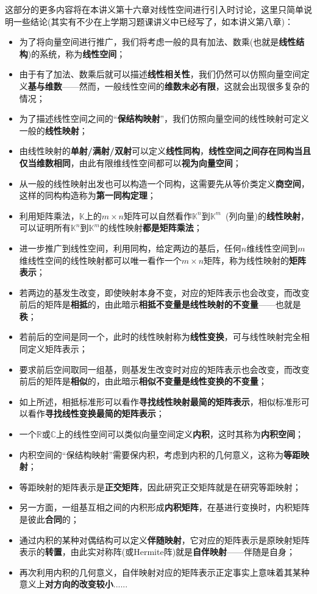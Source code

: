 \documentclass[a4paper,UTF8,fontset=windows,AutoFakeBold]{ctexart}
\begin{document}
这部分的更多内容将在本讲义第十六章对线性空间进行引入时讨论，这里只简单说明一些结论(其实有不少在上学期习题课讲义中已经写了，如本讲义第八章)：
\begin{itemize}
    \item 为了将向量空间进行推广，我们将考虑一般的具有加法、数乘(也就是\textbf{线性结构})的系统，称为\textbf{线性空间}；
    \item 由于有了加法、数乘后就可以描述\textbf{线性相关性}，我们仍然可以仿照向量空间定义\textbf{基与维数}——然而，一般线性空间的\textbf{维数未必有限}，这就会出现很多复杂的情况；
    \item 为了描述线性空间之间的``\textbf{保结构映射}''，我们仿照向量空间的线性映射可定义一般的\textbf{线性映射}；
    \item 由线性映射的\textbf{单射/满射/双射}可以定义\textbf{线性同构}，\textbf{线性空间之间存在同构当且仅当维数相同}，由此有限维线性空间都可以\textbf{视为向量空间}；
    \item 从一般的线性映射出发也可以构造一个同构，这需要先从等价类定义\textbf{商空间}，这样的同构构造称为\textbf{第一同构定理}；
    \item 利用矩阵乘法，$\mathbb{K}$上的$m\times n$矩阵可以自然看作$\mathbb{K}^n$到$\mathbb{K}^m$\ (列向量)的\textbf{线性映射}，可以证明所有$\mathbb{K}^n$到$\mathbb{K}^m$的线性映射\textbf{都是矩阵乘法}；
    \item 进一步推广到线性空间，利用同构，给定两边的基后，任何$n$维线性空间到$m$维线性空间的线性映射都可以唯一看作一个$m\times n$矩阵，称为线性映射的\textbf{矩阵表示}；
    \item 若两边的基发生改变，即使映射本身不变，对应的矩阵表示也会改变，而改变前后的矩阵是\textbf{相抵}的，由此暗示\textbf{相抵不变量是线性映射的不变量}——也就是\textbf{秩}；
    \item 若前后的空间是同一个，此时的线性映射称为\textbf{线性变换}，可与线性映射完全相同定义矩阵表示；
    \item 要求前后空间取同一组基，则基发生改变时对应的矩阵表示也会改变，而改变前后的矩阵是\textbf{相似}的，由此暗示\textbf{相似不变量是线性变换的不变量}；
    \item 如上所述，相抵标准形可以看作\textbf{寻找线性映射最简的矩阵表示}，相似标准形可以看作\textbf{寻找线性变换最简的矩阵表示}；
    \item 一个$\mathbb{R}$或$\mathbb{C}$上的线性空间可以类似向量空间定义\textbf{内积}，这时其称为\textbf{内积空间}；
    \item 内积空间的``保结构映射''需要保内积，考虑到内积的几何意义，这称为\textbf{等距映射}；
    \item 等距映射的矩阵表示是\textbf{正交矩阵}，因此研究正交矩阵就是在研究等距映射；
    \item 另一方面，一组基互相之间的内积形成\textbf{内积矩阵}，在基进行变换时，内积矩阵是彼此\textbf{合同}的；
    \item 通过内积的某种对偶结构可以定义\textbf{伴随映射}，它对应的矩阵表示是原映射矩阵表示的\textbf{转置}，由此实对称阵(或Hermite阵)就是\textbf{自伴映射}——伴随是自身；
    \item 再次利用内积的几何意义，自伴映射对应的矩阵表示正定事实上意味着其某种意义上\textbf{对方向的改变较小}......
\end{itemize}
\end{document}
